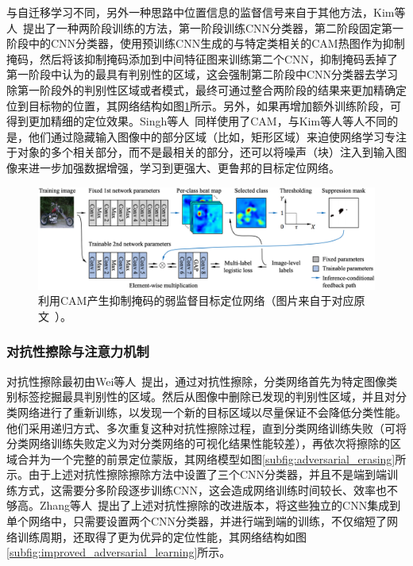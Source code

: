 与自迁移学习不同，另外一种思路中位置信息的监督信号来自于其他方法，Kim等人~\cite{Kim_2017_ICCV}提出了一种两阶段训练的方法，第一阶段训练CNN分类器，第二阶段固定第一阶段中的CNN分类器，使用预训练CNN生成的与特定类相关的CAM热图作为抑制掩码，然后将该抑制掩码添加到中间特征图来训练第二个CNN，抑制掩码丢掉了第一阶段中认为的最具有判别性的区域，这会强制第二阶段中CNN分类器去学习除第一阶段外的判别性区域或者模式，最终可通过整合两阶段的结果来更加精确定位到目标物的位置，其网络结构如图\ref{fig:cam_based_weakly_supervised_localization}所示。另外，如果再增加额外训练阶段，可得到更加精细的定位效果。Singh等人~\cite{Krishna2018}同样使用了CAM，与Kim等人等人不同的是，他们通过隐藏输入图像中的部分区域（比如，矩形区域）来迫使网络学习专注于对象的多个相关部分，而不是最相关的部分，还可以将噪声（块）注入到输入图像来进一步加强数据增强，学习到更强大、更鲁邦的目标定位网络。

\begin{figure}[h]
	\centering
	\includegraphics[width=1.0\textwidth]{figure/cam_based_weakly_supervised_localization}
	\caption[利用CAM产生抑制掩码的弱监督目标定位网络]{利用CAM产生抑制掩码的弱监督目标定位网络（图片来自于对应原文~\cite{Krishna2018}）。}
	\label{fig:cam_based_weakly_supervised_localization}
\end{figure}
\subsubsection*{对抗性擦除与注意力机制}
对抗性擦除最初由Wei等人~\cite{WeiFLCZY17}提出，通过对抗性擦除，分类网络首先为特定图像类别标签挖掘最具判别性的区域。然后从图像中删除已发现的判别性区域，并且对分类网络进行了重新训练，以发现一个新的目标区域以尽量保证不会降低分类性能。他们采用递归方式、多次重复这种对抗性擦除过程，直到分类网络训练失败（可将分类网络训练失败定义为对分类网络的可视化结果性能较差），再依次将擦除的区域合并为一个完整的前景定位蒙版，其网络模型如图\ref{subfig:adversarial_erasing}所示。由于上述对抗性擦除擦除方法中设置了三个CNN分类器，并且不是端到端训练方式，这需要分多阶段逐步训练CNN，这会造成网络训练时间较长、效率也不够高。Zhang等人~\cite{ZhangWF0H18}提出了上述对抗性擦除的改进版本，将这些独立的CNN集成到单个网络中，只需要设置两个CNN分类器，并进行端到端的训练，不仅缩短了网络训练周期，还取得了更为优异的定位性能，其网络结构如图\ref{subfig:improved_adversarial_learning}所示。

